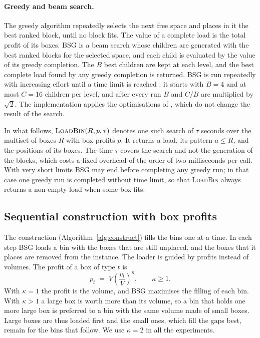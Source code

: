 \paragraph{Greedy and beam search.}
The greedy algorithm repeatedly selects the next free space and places in it the best ranked
block, until no block fits. The value of a complete load is the total profit of its boxes. BSG is
a beam search whose children are generated with the best ranked blocks for the selected space,
and each child is evaluated by the value of its greedy completion. The $B$ best children are kept
at each level, and the best complete load found by any greedy completion is returned. BSG is run
repeatedly with increasing effort until a time limit is reached \citep{Araya2017}: it starts with
$B=4$ and at most $C=16$ children per level, and after every run $B$ and $C/B$ are multiplied by
$\sqrt{2}$. The implementation applies the optimisations of \citet{Guesser2026}, which do not
change the result of the search.

In what follows, $\textsc{LoadBin}(R,p,\tau)$ denotes one such search of $\tau$ seconds over the multiset
of boxes $R$ with box profits $p$. It returns a load, its pattern $a\le R$, and the positions of
its boxes. The time $\tau$ covers the search and not the generation of the blocks, which costs a
fixed overhead of the order of two milliseconds per call. With very short limits BSG may end before completing
any greedy run; in that case one greedy run is completed without time limit, so that \textsc{LoadBin} always returns
a non-empty load when some box fits.

\subsection{Sequential construction with box profits}
\label{sec:m-construct}

The construction (Algorithm~\ref{alg:construct}) fills the bins one at a time. In each step
BSG loads a bin with the boxes that are still unplaced, and the boxes that it places are removed
from the instance. The loader is guided by profits instead of volumes. The profit of a box of
type $t$ is
\begin{equation}
\label{eq:profit}
p_t \;=\; V\left(\frac{v_t}{V}\right)^{\kappa},\qquad \kappa\ge 1 .
\end{equation}
With $\kappa=1$ the profit is the volume, and BSG maximises the filling of each bin. With
$\kappa>1$ a large box is worth more than its volume, so a bin that holds one more large box is
preferred to a bin with the same volume made of small boxes. Large boxes are thus loaded first
and the small ones, which fill the gaps best, remain for the bins that follow. We use $\kappa=2$ in all the experiments.

